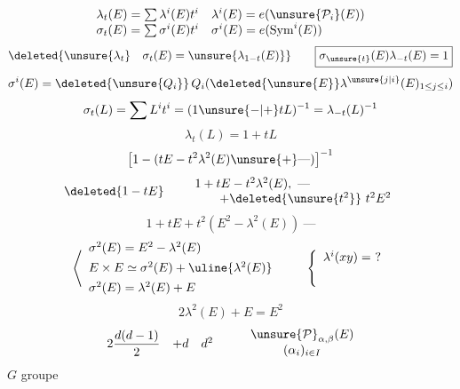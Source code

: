 \[
\begin{array}{ll}
\lambda_t(E)=\sum\lambda^i(E)t^i&\lambda^i(E)=e(\unsure{\mathcal P_i}(E))\\
\sigma_t(E)=\sum\sigma^i(E)t^i&\sigma^i(E)=e(\operatorname{Sym}^i(E))
\end{array}
\]
\[
\deleted{\unsure{\lambda_t}\quad\sigma_t(E)=\unsure{\lambda_{1-t}(E)}}\qquad
\boxed{\sigma_{\unsure{t}}(E)\lambda_{-t}(E)=1}
\]
\[
\sigma^i(E)=\deleted{\unsure{Q_i}}\,Q_i(\deleted{\unsure{E}}\lambda^{\unsure{j|i}}(E)_{1\leq j\leq i})
\]
\[
\sigma_t(L)=\sum L^it^i=(1\unsure{-|+}tL)^{-1}=\lambda_{-t}(L)^{-1}
\]
\[
\lambda_t(L)=1+tL
\]
\margin{$\sigma$}
\[
\left[1-(tE-t^2\lambda^2(E)\unsure{+}\text{---})\right]^{-1}
\]
\[
\deleted{1-tE}\qquad
\begin{array}{l}
1+tE-t^2\lambda^2(E),\ \text{---}\\
\qquad+\deleted{\unsure{t^2}}\ t^2E^2
\end{array}
\]
\[
1+tE+t^2(E^2-\lambda^2(E))\ \text{---}
\]
\[
\left\langle\begin{array}{l}
\sigma^2(E)=E^2-\lambda^2(E)\\[1ex]
E\times E\simeq\sigma^2(E)+\uline{\lambda^2(E)}\\[1ex]
\sigma^2(E)=\lambda^2(E)+E
\end{array}\right.
\qquad
\left\{\begin{array}{l}\lambda^i(xy)=\ ?\\[4ex]\end{array}\right.
\]
\[
\boxed{2\lambda^2(E)+E=E^2}
\]
\[
\begin{array}{ccc}2\dfrac{d(d-1)}{2}&+d&d^2\end{array}
\qquad
\begin{array}{c}\unsure{\mathcal P}_{\alpha,\beta}(E)\\(\alpha_i)_{i\in I}\end{array}
\]
$G$ groupe

